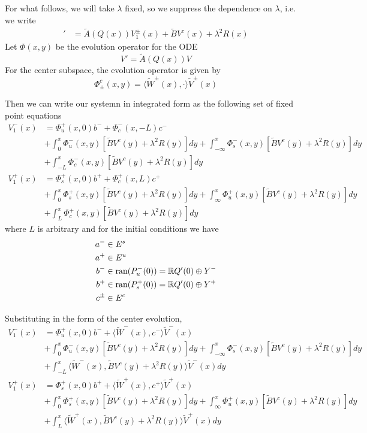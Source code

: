 \documentclass[thesis.tex]{subfiles}
\begin{document}
For what follows, we will take $\lambda$ fixed, so we suppress the dependence on $\lambda$, i.e. we write
\begin{align*}
[V_1^\pm(x)]' &= \tilde{A}(Q(x)) V_1^\pm(x) + \tilde{B} V^c(x) + \lambda^2 R(x)
\end{align*}
Let $\Phi(x,y)$ be the evolution operator for the ODE
\[
V' = \tilde{A}(Q(x))V
\]
For the center subspace, the evolution operator is given by
\[
\Phi^c_\pm(x,y) = \langle \tilde{W}^\pm(x), \cdot \rangle \tilde{V}^\pm(x)
\]

Then we can write our systemn in integrated form as the following set of fixed point equations
\begin{equation*}
\begin{aligned}
V_1^-(x) &= \Phi_u^+(x, 0) b^- + \Phi_c^-(x, -L) c^- \\
&+ \int_0^x \Phi_u^-(x, y) [\tilde{B} V^c(y) + \lambda^2 R(y)] dy + \int_{-\infty}^x \Phi_s^-(x, y)[\tilde{B} V^c(y) + \lambda^2 R(y)] dy \\
&+ \int_{-L}^x \Phi_c^-(x, y)[\tilde{B} V^c(y) + \lambda^2 R(y)] dy \\ 
V_1^+(x) &= \Phi_s^+(x, 0) b^+ + \Phi_c^+(x, L)c^+ \\
&+ \int_0^x \Phi_s^+(x, y)[\tilde{B} V^c(y) + \lambda^2 R(y)] dy
+ \int_{\infty}^x \Phi_u^+(x, y) [\tilde{B} V^c(y) + \lambda^2 R(y)] dy \\
&+ \int_{L}^x \Phi_c^+(x, y)[\tilde{B} V^c(y) + \lambda^2 R(y)] dy
\end{aligned}
\end{equation*}
where $L$ is arbitrary and for the initial conditions we have
\begin{align*}
a^- &\in E^s \\
a^+ &\in E^u \\
b^- &\in \text{ran}(P_u^-(0)) = {\mathbb R} Q'(0) \oplus Y^- \\
b^+ &\in \text{ran}(P_s^+(0)) = {\mathbb R} Q'(0) \oplus Y^+ \\
c^\pm &\in E^c \\
\end{align*}

Substituting in the form of the center evolution,
\begin{equation*}
\begin{aligned}
V_1^-(x) &= \Phi_u^+(x, 0) b^- + \langle \tilde{W}^-(x), c^- \rangle \tilde{V}^-(x) \\
&+ \int_0^x \Phi_u^-(x, y) [\tilde{B} V^c(y) + \lambda^2 R(y)] dy + \int_{-\infty}^x \Phi_s^-(x, y)[\tilde{B} V^c(y) + \lambda^2 R(y)] dy \\
&+ \int_{-L}^x \langle \tilde{W}^-(x), \tilde{B} V^c(y) + \lambda^2 R(y) \rangle \tilde{V}^-(x) dy \\ 
V_1^+(x) &= \Phi_s^+(x, 0) b^+ + \langle \tilde{W}^+(x), c^+ \rangle \tilde{V}^+(x) \\
&+ \int_0^x \Phi_s^+(x, y)[\tilde{B} V^c(y) + \lambda^2 R(y)] dy
+ \int_{\infty}^x \Phi_u^+(x, y) [\tilde{B} V^c(y) + \lambda^2 R(y)] dy \\
&+ \int_{L}^x \langle \tilde{W}^+(x), \tilde{B} V^c(y) + \lambda^2 R(y) \rangle \tilde{V}^+(x) dy
\end{aligned}
\end{equation*}
\end{document}
